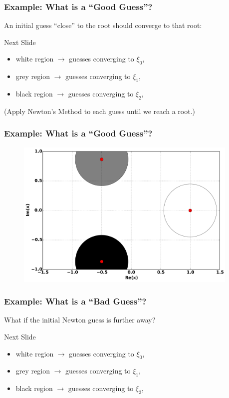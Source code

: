 \documentclass{beamer}
\begin{document}
\begin{frame}
  \frametitle{Example: What is a ``Good Guess''?}

  An initial guess ``close'' to the root should converge to that root:

  \pause

  \begin{block}{Next Slide}
  \begin{itemize}
  \item white region $\to$ guesses converging to $\xi_0$,
  \item grey region $\to$ guesses converging to $\xi_1$,
  \item black region $\to$ guesses converging to $\xi_2$,
  \end{itemize}
  \end{block}

  (Apply Newton's Method to each guess until we reach a root.)
\end{frame}




\begin{frame}
  \frametitle{Example: What is a ``Good Guess''?}
  \begin{figure}
    \centering
    \includegraphics[width=0.95\textwidth]{images/newton_roots_circles.pdf}
  \end{figure}
\end{frame}


\begin{frame}
  \frametitle{Example: What is a ``Bad Guess''?}

  What if the initial Newton guess is further away? \\

  \pause

  \vspace{16pt}

  \begin{block}{Next Slide}
    \begin{itemize}
    \item white region $\to$ guesses converging to $\xi_0$,
    \item grey region $\to$ guesses converging to $\xi_1$,
    \item black region $\to$ guesses converging to $\xi_2$,
  \end{itemize}
  \end{block}

\end{frame}
\end{document}
